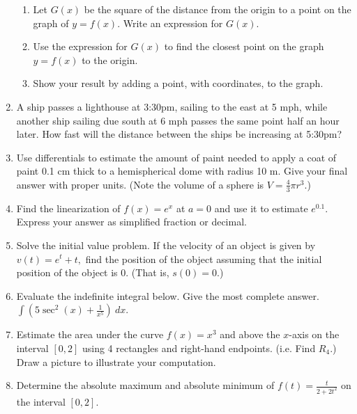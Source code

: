 \documentclass[12pt]{article}
\begin{document}
\begin{enumerate}
\begin{enumerate}
\item  Let $G(x)$ be the square of the distance from the origin to a point on the graph of $y=f(x)$.  Write an expression for $G(x)$.
\vfill

\item Use the expression for $G(x)$ to find the closest point on the graph $y=f(x)$ to the origin.
\vfill

\item  Show your result by adding a point, with coordinates, to the graph.
\end{enumerate}
\newpage
\item A ship passes a lighthouse at 3:30pm, sailing to the east at 5 mph, while another ship sailing due south at 6 mph passes the same point half an hour later.  How fast will the distance between the ships be increasing at 5:30pm?
\vfill
\item Use differentials to estimate the amount of paint needed to apply a coat of paint 0.1 cm thick to a hemispherical dome with radius 10 m. Give your final answer with proper units. (Note the volume of a sphere is $V=\frac{4}{3} \pi r^3.$)
\vfill
\newpage
\item Find the linearization of $f(x)=e^x$ at $a=0$ and use it to estimate $e^{0.1}.$ Express your answer as simplified fraction or decimal.
\vfill
\item Solve the initial value problem. If the velocity of an object is given by $v(t)=e^{t} +t,$ find the position of the object assuming that the initial position of the object is $0.$ (That is, $s(0)=0.$)
\vfill
\item Evaluate the indefinite integral below. Give the most complete answer.
$\int (5\sec^2(x) + \frac{1}{x^5}) \: dx$.
\vfill
\newpage
\item Estimate the area under the curve $f(x)=x^3$ and above the $x$-axis on the interval $[0,2]$ using 4 rectangles and right-hand endpoints. (i.e. Find $R_4.$) Draw a picture to illustrate your computation.
\vfill
\item Determine the absolute maximum and absolute minimum of $f(t)=\frac{{t}}{2+2t^2}$ on the interval $[0,2].$
\vfill
\end{enumerate}
\end{document}

